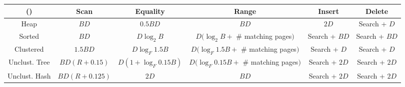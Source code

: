 \documentclass[landscape,8pt]{extarticle}
\begin{document}
\begin{multicols}{4}
\begin{center}
\begin{adjustbox}{angle=270}
            \begin{tabular}{ | c | c | c | c | c | c | } \toprule
                ()            & Scan          & Equality              & Range                                    & Insert        & Delete        \\ \midrule
                Heap          & $BD$          & $0.5 BD$              & $BD$                                     & $2D$          & Search + $D$  \\ \midrule
                Sorted        & $BD$          & $D \log_2 B$          & $D(\log_2 B +$ \# matching pages$)$      & Search + $BD$ & Search + $BD$ \\ \midrule
                Clustered     & $1.5 BD$      & $D \log_F 1.5 B$      & $D(\log_F 1.5B + $ \# matching pages$)$  & Search + $D$  & Search + $D$  \\ \midrule
                Unclust. Tree & $BD(R+0.15)$  & $D(1 + \log_F 0.15B)$ & $D(\log_F 0.15B + $ \# matching pages$)$ & Search + $2D$ & Search + $2D$ \\ \midrule
                Unclust. Hash & $BD(R+0.125)$ & $2D$                  & $BD$                                     & Search + $2D$ & Search + $2D$ \\ \bottomrule
            \end{tabular}
        \end{adjustbox}
    \end{center}
\end{multicols}
\end{document}
